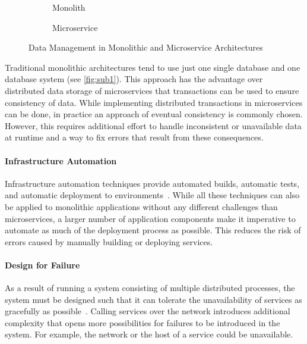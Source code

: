 \begin{figure}[!htb]
    \centering
    \begin{subfigure}{.5\textwidth}
        \centering
        
        \caption{Monolith}\label{fig:sub1}
    \end{subfigure}%
    \begin{subfigure}{.5\textwidth}
        \centering
        
        \caption{Microservice}\label{fig:sub2}
    \end{subfigure}
    \caption{Data Management in Monolithic and Microservice Architectures~\cite{Lewis2014}}\label{fig:test}
\end{figure}

Traditional monolithic architectures tend to use just one single database and one database system (see \autoref{fig:sub1}).
This approach has the advantage over distributed data storage of microservices that transactions can be used to ensure consistency of data.
While implementing distributed transactions in microservices can be done, in practice an approach of eventual consistency is commonly chosen.
However, this requires additional effort to handle inconsistent or unavailable data at runtime and a way to fix errors that result from these consequences. 

\paragraph{Infrastructure Automation}

Infrastructure automation techniques provide automated builds, automatic tests, and automatic deployment to environments~\cite{Lewis2014}.
While all these techniques can also be applied to monolithic applications without any different challenges than microservices, a larger number of application components make it imperative to automate as much of the deployment process as possible.
This reduces the risk of errors caused by manually building or deploying services.

\paragraph{Design for Failure}

As a result of running a system consisting of multiple distributed processes, the system must be designed such that it can tolerate the unavailability of services as gracefully as possible~\cite{Lewis2014}.
Calling services over the network introduces additional complexity that opens more possibilities for failures to be introduced in the system.
For example, the network or the host of a service could be unavailable.

